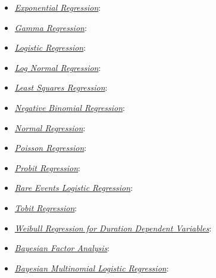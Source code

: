 \documentclass[letterpaper,10pt,english]{sphinxmanual}
\begin{document}
\begin{itemize}
\item {} 
{\hyperref[zelig-exp:zexp]{\emph{Exponential Regression}}}: 

\item {} 
{\hyperref[zelig-gamma:zgamma]{\emph{Gamma Regression}}}: 

\item {} 
{\hyperref[zelig-logit:zlogit]{\emph{Logistic Regression}}}: 

\item {} 
{\hyperref[zelig-lognorm:zlognorm]{\emph{Log Normal Regression}}}: 

\item {} 
{\hyperref[zelig-ls:zls]{\emph{Least Squares Regression}}}: 

\item {} 
{\hyperref[zelig-negbin:znegbin]{\emph{Negative Binomial Regression}}}: 

\item {} 
{\hyperref[zelig-normal:znorm]{\emph{Normal Regression}}}: 

\item {} 
{\hyperref[zelig-poisson:zpoisson]{\emph{Poisson Regression}}}: 

\item {} 
{\hyperref[zelig-probit:zprobit]{\emph{Probit Regression}}}: 

\item {} 
{\hyperref[zelig-relogit:zrelogit]{\emph{Rare Events Logistic Regression}}}: 

\item {} 
{\hyperref[zelig-tobit:ztobit]{\emph{Tobit Regression}}}: 

\item {} 
{\hyperref[zelig-weibull:zweibull]{\emph{Weibull Regression for Duration Dependent Variables}}}: 

\item {} 
{\hyperref[zelig-factorbayes:zfactorbayes]{\emph{Bayesian Factor Analysis}}}: 

\item {} 
{\hyperref[zelig-mlogitbayes:zmlogitbayes]{\emph{Bayesian Multinomial Logistic Regression}}}: 


\end{itemize}
\end{document}
